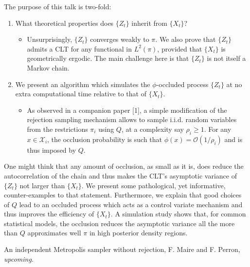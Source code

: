 \begin{talk}
The purpose of this talk is two-fold:
\begin{enumerate}
  \item What theoretical properties does $\{Z_t\}$ inherit from $\{X_t\}$? 
  \begin{itemize}
    \item Unsurprisingly, $\{Z_t\}$ converges weakly to $\pi$. We also prove that $\{Z_t\}$ admits a CLT for any functional in $L^2(\pi)$, provided that $\{X_t\}$ is geometrically ergodic. The main challenge here is that $\{Z_t\}$ is not itself a Markov chain.
  \end{itemize}
  \item We present an algorithm which simulates the $\phi$-occluded process $\{Z_t\}$ at no extra computational time relative to that of $\{X_t\}$.
  \begin{itemize}
  \item As observed in a companion paper [1], a simple modification of the rejection sampling mechanism allows to sample i.i.d. random variables from the restrictions $\pi_i$ using $Q$, at a complexity say $\rho_i\geq 1$. For any $x\in\mathcal{X}_i$, the occlusion probability is such that $\phi(x)=\mathcal{O}(1/\rho_i)$ and is thus imposed by $Q$.
  \end{itemize}    
\end{enumerate}

One might think that any amount of occlusion, as small as it is, does reduce the autocorrelation of the chain and thus makes the CLT's asymptotic variance of $\{Z_t\}$ not larger than $\{X_t\}$. We present some pathological, yet informative, counter-examples to that statement. Furthermore, we explain that good choices of $Q$ lead to an occluded process which acts as a control variate mechanism and thus improves the efficiency of $\{X_t\}$. A simulation study shows that, for common statistical models, the occlusion reduces the asymptotic variance all the more than $Q$ approximates well $\pi$ in high posterior density regions.


\begin{list}{[1]}
  \item An independent Metropolis sampler without rejection, F. Maire and F. Perron, \textit{upcoming}.
\end{list}



\end{talk}
